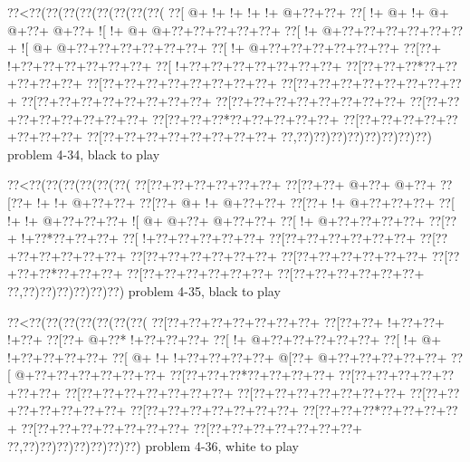 \vbox{\vbox{\goo
\0??<\0??(\0??(\0??(\0??(\0??(\0??(\0??(\0??(
\0??[\- @+\- !+\- !+\- !+\- !+\- @+\0??+\0??+
\0??[\- !+\- @+\- !+\- @+\- @+\0??+\- @+\0??+
\- ![\- !+\- @+\- @+\0??+\0??+\0??+\0??+\0??+
\0??[\- !+\- @+\0??+\0??+\0??+\0??+\0??+\0??+
\- ![\- @+\- @+\0??+\0??+\0??+\0??+\0??+\0??+
\0??[\- !+\- @+\0??+\0??+\0??+\0??+\0??+\0??+
\0??[\0??+\- !+\0??+\0??+\0??+\0??+\0??+\0??+
\0??[\- !+\0??+\0??+\0??+\0??+\0??+\0??+\0??+
\0??[\0??+\0??+\0??*\0??+\0??+\0??+\0??+\0??+
\0??[\0??+\0??+\0??+\0??+\0??+\0??+\0??+\0??+
\0??[\0??+\0??+\0??+\0??+\0??+\0??+\0??+\0??+
\0??[\0??+\0??+\0??+\0??+\0??+\0??+\0??+\0??+
\0??[\0??+\0??+\0??+\0??+\0??+\0??+\0??+\0??+
\0??[\0??+\0??+\0??+\0??+\0??+\0??+\0??+\0??+
\0??[\0??+\0??+\0??*\0??+\0??+\0??+\0??+\0??+
\0??[\0??+\0??+\0??+\0??+\0??+\0??+\0??+\0??+
\0??[\0??+\0??+\0??+\0??+\0??+\0??+\0??+\0??+
\0??,\0??)\0??)\0??)\0??)\0??)\0??)\0??)\0??)
}
\hfil problem 4-34, black to play\hfil\break
}

\vbox{\vbox{\goo
\0??<\0??(\0??(\0??(\0??(\0??(\0??(
\0??[\0??+\0??+\0??+\0??+\0??+\0??+
\0??[\0??+\0??+\- @+\0??+\- @+\0??+
\0??[\0??+\- !+\- !+\- @+\0??+\0??+
\0??[\0??+\- @+\- !+\- @+\0??+\0??+
\0??[\0??+\- !+\- @+\0??+\0??+\0??+
\0??[\- !+\- !+\- @+\0??+\0??+\0??+
\- ![\- @+\- @+\0??+\- @+\0??+\0??+
\0??[\- !+\- @+\0??+\0??+\0??+\0??+
\0??[\0??+\- !+\0??*\0??+\0??+\0??+
\0??[\- !+\0??+\0??+\0??+\0??+\0??+
\0??[\0??+\0??+\0??+\0??+\0??+\0??+
\0??[\0??+\0??+\0??+\0??+\0??+\0??+
\0??[\0??+\0??+\0??+\0??+\0??+\0??+
\0??[\0??+\0??+\0??+\0??+\0??+\0??+
\0??[\0??+\0??+\0??*\0??+\0??+\0??+
\0??[\0??+\0??+\0??+\0??+\0??+\0??+
\0??[\0??+\0??+\0??+\0??+\0??+\0??+
\0??,\0??)\0??)\0??)\0??)\0??)\0??)
}
\hfil problem 4-35, black to play\hfil\break
}

\vbox{\vbox{\goo
\0??<\0??(\0??(\0??(\0??(\0??(\0??(\0??(
\0??[\0??+\0??+\0??+\0??+\0??+\0??+\0??+
\0??[\0??+\0??+\- !+\0??+\0??+\- !+\0??+
\0??[\0??+\- @+\0??*\- !+\0??+\0??+\0??+
\0??[\- !+\- @+\0??+\0??+\0??+\0??+\0??+
\0??[\- !+\- @+\- !+\0??+\0??+\0??+\0??+
\0??[\- @+\- !+\- !+\0??+\0??+\0??+\0??+
\- @[\0??+\- @+\0??+\0??+\0??+\0??+\0??+
\0??[\- @+\0??+\0??+\0??+\0??+\0??+\0??+
\0??[\0??+\0??+\0??*\0??+\0??+\0??+\0??+
\0??[\0??+\0??+\0??+\0??+\0??+\0??+\0??+
\0??[\0??+\0??+\0??+\0??+\0??+\0??+\0??+
\0??[\0??+\0??+\0??+\0??+\0??+\0??+\0??+
\0??[\0??+\0??+\0??+\0??+\0??+\0??+\0??+
\0??[\0??+\0??+\0??+\0??+\0??+\0??+\0??+
\0??[\0??+\0??+\0??*\0??+\0??+\0??+\0??+
\0??[\0??+\0??+\0??+\0??+\0??+\0??+\0??+
\0??[\0??+\0??+\0??+\0??+\0??+\0??+\0??+
\0??,\0??)\0??)\0??)\0??)\0??)\0??)\0??)
}
\hfil problem 4-36, white to play\hfil\break
}

